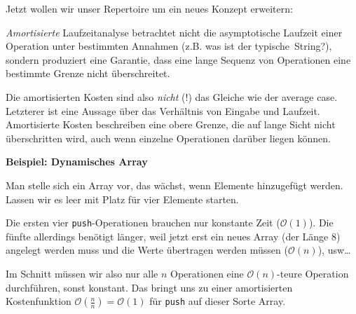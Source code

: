 \documentclass{beamer}
\begin{document}

\begin{frame}
Jetzt wollen wir unser Repertoire um ein neues Konzept erweitern:\smallskip\smallskip

\emph{Amortisierte} Laufzeitanalyse betrachtet nicht die asymptotische Laufzeit einer Operation unter bestimmten Annahmen (z.B. was ist der \glqq typische\grqq\ String?), sondern 
produziert eine Garantie, dass eine lange Sequenz von Operationen eine bestimmte Grenze nicht überschreitet.\pause\bigskip

Die amortisierten Kosten sind also \emph{nicht} (!) das Gleiche wie der average case. Letzterer ist eine Aussage über das Verhältnis von Eingabe und Laufzeit. Amortisierte Kosten beschreiben eine obere Grenze, die auf lange Sicht nicht überschritten wird, auch wenn einzelne Operationen darüber liegen können.
\end{frame}


\begin{frame}
\textbf{Beispiel: Dynamisches Array}\bigskip

Man stelle sich ein Array vor, das wächst, wenn Elemente hinzugefügt werden. Lassen wir es leer mit Platz für vier Elemente starten.\pause\bigskip

Die ersten vier \texttt{push}-Operationen brauchen nur konstante Zeit ($\mathcal{O}(1)$). Die fünfte allerdings benötigt länger, weil jetzt erst ein neues Array (der Länge 8) angelegt werden muss und die Werte übertragen werden müssen ($\mathcal{O}(n)$), usw\dots
\pause\bigskip

Im Schnitt müssen wir also nur alle $n$ Operationen eine $\mathcal{O}(n)$-teure Operation durchführen, sonst konstant. Das bringt uns zu einer amortisierten Kostenfunktion $\mathcal{O}\left(\frac{n}{n}\right) = \mathcal{O}(1)$ für \texttt{push} auf dieser Sorte Array.
\end{frame}

\end{document}
